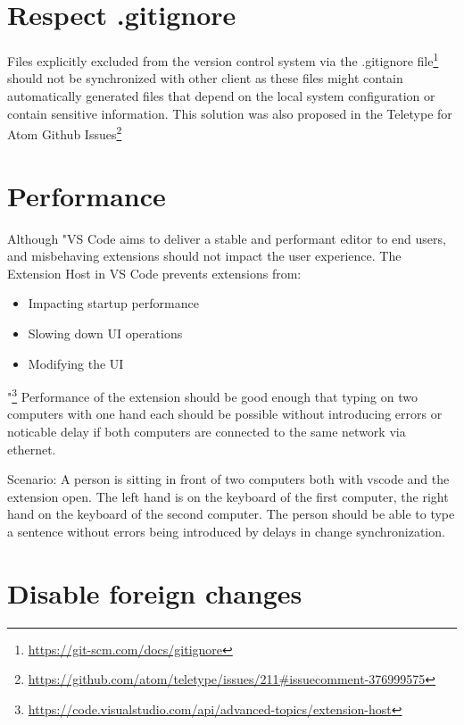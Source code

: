 \section{Respect .gitignore}

Files explicitly excluded from the version control system via the .gitignore file\footnote{\href{https://git-scm.com/docs/gitignore}{https://git-scm.com/docs/gitignore}} should not be synchronized with other client as these files might contain automatically generated files that depend on the local system configuration or contain sensitive information. This solution was also proposed in the Teletype for Atom Github Issues\footnote{\href{https://github.com/atom/teletype/issues/211\#issuecomment-376999575}{https://github.com/atom/teletype/issues/211\#issuecomment-376999575}}

\section{Performance}

Although "VS Code aims to deliver a stable and performant editor to end users, and misbehaving extensions should not impact the user experience. The Extension Host in VS Code prevents extensions from:
\begin{itemize}
    \item Impacting startup performance
    \item Slowing down UI operations
    \item Modifying the UI
\end{itemize}"\footnote{\href{https://code.visualstudio.com/api/advanced-topics/extension-host}{https://code.visualstudio.com/api/advanced-topics/extension-host}}
Performance of the extension should be good enough that typing on two computers with one hand each should be possible without introducing errors or noticable delay if both computers are connected to the same network via ethernet.

Scenario: A person is sitting in front of two computers both with vscode and the extension open. The left hand is on the keyboard of the first computer, the right hand on the keyboard of the second computer. The person should be able to type a sentence without errors being introduced by delays in change synchronization.

\section{Disable foreign changes}

